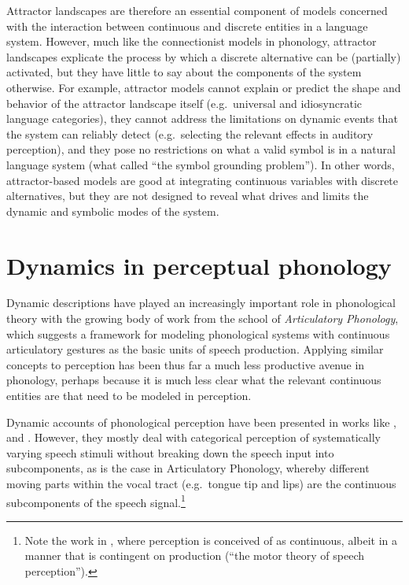 \begin{sloppypar}
Attractor landscapes are therefore an essential component of
models concerned with the interaction between continuous and discrete entities in a language system.
However, much like the connectionist models in phonology, attractor landscapes explicate the process by which a discrete alternative can be (partially) activated, but they have little to say about the components of the system otherwise.
For example, attractor models cannot explain or predict the shape and behavior of the attractor landscape itself (e.g.~universal and idiosyncratic language categories), they cannot address the limitations on dynamic events that the system can reliably detect (e.g.~selecting the relevant effects in auditory perception), and they pose no restrictions on what a valid symbol is in a natural language system (what \citealt{harnad1990symbol} called ``the symbol grounding problem'').
In other words, attractor-based models are good at integrating continuous variables with discrete alternatives, but they are not designed to reveal what drives and limits the dynamic and symbolic modes of the system.
\end{sloppypar}

\section{Dynamics in perceptual phonology}\label{dynamics-in-perceptual-phonology}

Dynamic descriptions have played an increasingly important role in phonological theory
with the growing body of work from the school of \emph{Articulatory Phonology}, which suggests a framework for modeling phonological systems with
continuous articulatory gestures as the basic units of speech production.
Applying similar concepts to perception has been thus far a much less productive avenue in phonology, perhaps because it is much less clear what the relevant continuous entities are that need to be modeled in perception.

Dynamic accounts of phonological perception have been presented in works like \citet{tuller1994nonlinear, case1995evaluation, hock2003dynamical, tuller2004categorization, tuller2008dynamical}, and \citet{lancia2013interaction}.
However, they mostly deal with categorical perception of systematically varying speech stimuli without breaking down the speech input into subcomponents, as is the case in Articulatory Phonology, whereby different moving parts within the vocal tract (e.g.~tongue tip and lips) are the continuous subcomponents of the speech signal.\footnote{Note the work in \citet{liberman1985motor}, where perception is conceived of as continuous, albeit in a manner that is contingent on production (\enquote{the motor theory of speech perception}).}

